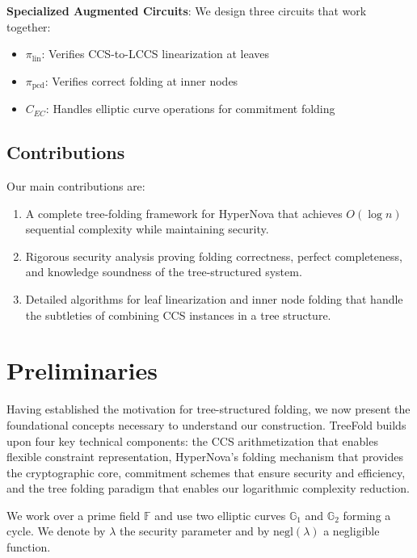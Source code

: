 \documentclass[11pt,a4paper]{article}
\theoremstyle{plain}
\theoremstyle{definition}
\newcommand{\F}{\mathbb{F}}
\newcommand{\G}{\mathbb{G}}
\newcommand{\negl}{\mathrm{negl}}
\begin{document}
\textbf{Specialized Augmented Circuits}: We design three circuits that work together:
\begin{itemize}
\item $\pi_{\text{lin}}$: Verifies CCS-to-LCCS linearization at leaves
\item $\pi_{\text{pcd}}$: Verifies correct folding at inner nodes
\item $C_{EC}$: Handles elliptic curve operations for commitment folding
\end{itemize}

\subsection{Contributions}

Our main contributions are:

\begin{enumerate}
\item A complete tree-folding framework for HyperNova that achieves $O(\log n)$ sequential complexity while maintaining security.

\item Rigorous security analysis proving folding correctness, perfect completeness, and knowledge soundness of the tree-structured system.

\item Detailed algorithms for leaf linearization and inner node folding that handle the subtleties of combining CCS instances in a tree structure.
\end{enumerate}

\section{Preliminaries}

Having established the motivation for tree-structured folding, we now present the foundational concepts necessary to understand our construction. TreeFold builds upon four key technical components: the CCS arithmetization that enables flexible constraint representation, HyperNova's folding mechanism that provides the cryptographic core, commitment schemes that ensure security and efficiency, and the tree folding paradigm that enables our logarithmic complexity reduction.

We work over a prime field $\F$ and use two elliptic curves $\G_1$ and $\G_2$ forming a cycle. We denote by $\lambda$ the security parameter and by $\negl(\lambda)$ a negligible function.
\end{document}
